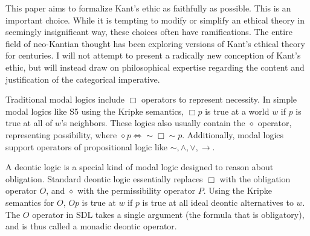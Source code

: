 \begin{isabellebody}
\begin{isamarkuptext}
This paper aims to formalize Kant's ethic as faithfully as possible. This is an important choice. 
While it is tempting to modify or simplify an ethical theory in seemingly insignificant way, these 
choices often have ramifications. The entire field of neo-Kantian thought 
has been exploring versions of Kant's ethical theory for centuries. I will not attempt to present a 
radically new conception of Kant's ethic, but will instead draw on philosophical expertise regarding
the content and justification of the categorical imperative.%
\end{isamarkuptext}\isamarkuptrue%
%
\isadelimdocument
%
\endisadelimdocument
%
\isatagdocument
%
\isamarkuptrue%
%
\isamarkuptrue%
%
\endisatagdocument
{\isafolddocument}%
%
\isadelimdocument
%
\endisadelimdocument
%
\begin{isamarkuptext}%
Traditional modal logics include $\Box$ operators to represent necessity. In simple modal logics like S5 \cite{cresswell} 
using the Kripke semantics, $\Box p$ is true at a world $w$ if $p$ is true at all of $w$'s neighbors. 
These logics also usually contain the $\diamond$ operator, representing possibility, where
 $\diamond p \iff \sim \Box \sim p$. Additionally, modal logics support operators of propositional 
logic like $\sim, \wedge, \vee, \rightarrow$.

A deontic logic is a special kind of modal logic designed to reason about obligation. Standard deontic
logic \cite{cresswell} \cite{sep-logic-deontic} essentially replaces $\Box$ with the obligation operator
$O$, and $\diamond$ with the permissibility operator $P$. Using the Kripke semantics for $O$, $O p$ 
is true at $w$ if $p$ is true at all  ideal deontic alternatives to $w$. The $O$ operator in SDL
takes a single argument (the formula that is obligatory), and is thus called a monadic deontic operator.


\end{isamarkuptext}
\end{isabellebody}
